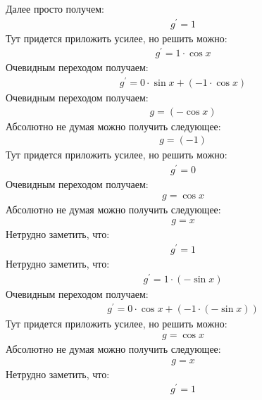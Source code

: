 \documentclass[12pt,a4paper]{scrartcl}
\begin{document}
Далее просто получем:
\begin{gather}\label{eq:f2a57a10}g^\prime  = 1\end{gather}
Тут придется приложить усилее, но решить можно:
\begin{gather}\label{eq:f2a579e0}g^\prime  = 1 \cdot  \cos{ x } \end{gather}
Очевидным переходом получаем:
\begin{gather}\label{eq:f2a57680}g^\prime  = 0 \cdot  \sin{ x }  +  \left(-1 \cdot  \cos{ x } \right) \end{gather}
Очевидным переходом получаем:
\begin{gather}\label{eq:f2a57830}g  =  \left(- \cos{ x } \right) \end{gather}
Абсолютно не думая можно получить следующее:
\begin{gather}\label{eq:f2a577d0}g  = \left(-1\right)\end{gather}
Тут придется приложить усилее, но решить можно:
\begin{gather}\label{eq:f2a578f0}g^\prime  = 0\end{gather}
Очевидным переходом получаем:
\begin{gather}\label{eq:f2a57a10}g  =  \cos{ x } \end{gather}
Абсолютно не думая можно получить следующее:
\begin{gather}\label{eq:f2a57860}g  = x\end{gather}
Нетрудно заметить, что:
\begin{gather}\label{eq:f2a57b90}g^\prime  = 1\end{gather}
Нетрудно заметить, что:
\begin{gather}\label{eq:f2a57b60}g^\prime  = 1 \cdot  \left(- \sin{ x } \right) \end{gather}
Очевидным переходом получаем:
\begin{gather}\label{eq:f2a574d0}g^\prime  = 0 \cdot  \cos{ x }  +  \left(-1 \cdot  \left(- \sin{ x } \right) \right) \end{gather}
Тут придется приложить усилее, но решить можно:
\begin{gather}\label{eq:f2a57b90}g  =  \cos{ x } \end{gather}
Абсолютно не думая можно получить следующее:
\begin{gather}\label{eq:f2a578c0}g  = x\end{gather}
Нетрудно заметить, что:
\begin{gather}\label{eq:f2a57cb0}g^\prime  = 1\end{gather}
\end{document}
